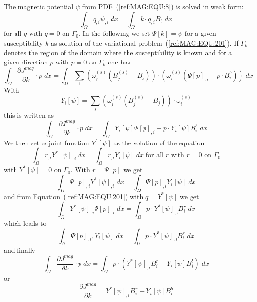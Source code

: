 The magnetic potential $\psi$ from PDE~(\ref{ref:MAG:EQU:8}) is solved in weak form:
\begin{equation}\label{ref:MAG:EQU:201}
\int_{\Omega} q_{,i} \psi_{,i} \; dx  = \int_{\Omega}  k \cdot q_{,i}  B^r_i \; dx 
\end{equation} 
for all $q$ with $q=0$ on $\Gamma_{0}$.
In the following we set $\Psi[k]=\psi$ for a given susceptibility $k$ as
solution of the variational problem~(\ref{ref:MAG:EQU:201}).
If $\Gamma_{k}$ denotes the region of the domain where the susceptibility is
known and for a given direction $p$ with $p=0$ on $\Gamma_{k}$ one has
\begin{equation}\label{ref:MAG:EQU:201aa}
\int_{\Omega}   \frac{\partial J^{mag}}{\partial k} \cdot p \; dx  = \int_{\Omega}  
\sum_{s} (\omega^{(s)}_j 
( B^{(s)}_j-B_{j}))  \cdot ( \omega^{(s)}_i ( \Psi[p]_{,i} - p  \cdot B^b_i  ) ) \; dx  
\end{equation} 
With
\begin{equation}\label{ref:MAG:EQU:202c}
Y_i[\psi]=   \sum_{s} (\omega^{(s)}_j 
(B^{(s)}_j - B_{j}) )  \cdot \omega^{(s)}_i  
\end{equation} 
this is written as 
\begin{equation}\label{ref:MAG:EQU:202cc}
\int_{\Omega}   \frac{\partial J^{mag}}{\partial k} \cdot p \;  dx  = \int_{\Omega}  
Y_i[\psi] \Psi[p]_{,i} - p \cdot Y_i[\psi]B^b_i   \; dx  
\end{equation} 
We then set adjoint function $Y^*[\psi]$ as the solution of the equation 
\begin{equation}\label{ref:MAG:EQU:202d}
\int_{\Omega} r_{,i} Y^*[\psi]_{,i} \; dx  =  \int_{\Omega} r_{,i} Y_i[\psi]  \; dx  \mbox{ for all } r \mbox{ with } r=0 \mbox{ on } \Gamma_{0}
\end{equation} 
with $Y^*[\psi]=0$ on $\Gamma_{0}$. With $r=\Psi[p]$ we get
\begin{equation}\label{ref:MAG:EQU:202dd}
\int_{\Omega} \Psi[p]_{,i} Y^*[\psi]_{,i} \; dx  =  \int_{\Omega} \Psi[p]_{,i} Y_i[\psi]  \; dx
\end{equation} 
and from Equation~(\ref{ref:MAG:EQU:201}) with $q=Y^*[\psi]$ we get
\begin{equation}\label{ref:MAG:EQU:20e}
\int_{\Omega} Y^*[\psi]_{,i}  \Psi[p]_{,i} \; dx  = \int_{\Omega}  p \cdot Y^*[\psi]_{,i}  B^r_i \; dx  
\end{equation}
which leads to 
\begin{equation}\label{ref:MAG:EQU:20ee}
\int_{\Omega} \Psi[p]_{,i} ,Y_i[\psi]  \; dx  = \int_{\Omega}  p \cdot Y^*[\psi]_{,i}  B^r_i \; dx  
\end{equation}
and finally
\begin{equation}\label{ref:MAG:EQU:201a}
\int_{\Omega}   \frac{\partial J^{mag}}{\partial k} \cdot p \;  dx  = \int_{\Omega}  
p \cdot (Y^*[\psi]_{,i}  B^r_i - Y_i[\psi] B^b_i) \; dx  
\end{equation} 
or 
\begin{equation}\label{ref:MAG:EQU:201b}
\frac{\partial J^{mag}}{\partial k} = Y^*[\psi]_{,i}  B^r_i - Y_i[\psi] B^b_i
\end{equation}

